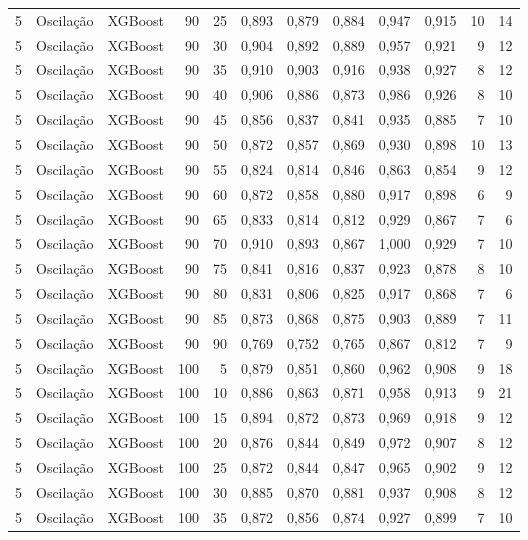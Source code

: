 \begin{longtable}{@{}rllrrrrrrrrr@{}}
5 & Oscilação & XGBoost & 90 & 25 & 0,893 & 0,879 & 0,884 & 0,947 & 0,915 & 10 & 14 \\
5 & Oscilação & XGBoost & 90 & 30 & 0,904 & 0,892 & 0,889 & 0,957 & 0,921 & 9 & 12 \\
5 & Oscilação & XGBoost & 90 & 35 & 0,910 & 0,903 & 0,916 & 0,938 & 0,927 & 8 & 12 \\
5 & Oscilação & XGBoost & 90 & 40 & 0,906 & 0,886 & 0,873 & 0,986 & 0,926 & 8 & 10 \\
5 & Oscilação & XGBoost & 90 & 45 & 0,856 & 0,837 & 0,841 & 0,935 & 0,885 & 7 & 10 \\
5 & Oscilação & XGBoost & 90 & 50 & 0,872 & 0,857 & 0,869 & 0,930 & 0,898 & 10 & 13 \\
5 & Oscilação & XGBoost & 90 & 55 & 0,824 & 0,814 & 0,846 & 0,863 & 0,854 & 9 & 12 \\
5 & Oscilação & XGBoost & 90 & 60 & 0,872 & 0,858 & 0,880 & 0,917 & 0,898 & 6 & 9 \\
5 & Oscilação & XGBoost & 90 & 65 & 0,833 & 0,814 & 0,812 & 0,929 & 0,867 & 7 & 6 \\
5 & Oscilação & XGBoost & 90 & 70 & 0,910 & 0,893 & 0,867 & 1,000 & 0,929 & 7 & 10 \\
5 & Oscilação & XGBoost & 90 & 75 & 0,841 & 0,816 & 0,837 & 0,923 & 0,878 & 8 & 10 \\
5 & Oscilação & XGBoost & 90 & 80 & 0,831 & 0,806 & 0,825 & 0,917 & 0,868 & 7 & 6 \\
5 & Oscilação & XGBoost & 90 & 85 & 0,873 & 0,868 & 0,875 & 0,903 & 0,889 & 7 & 11 \\
5 & Oscilação & XGBoost & 90 & 90 & 0,769 & 0,752 & 0,765 & 0,867 & 0,812 & 7 & 9 \\
5 & Oscilação & XGBoost & 100 & 5 & 0,879 & 0,851 & 0,860 & 0,962 & 0,908 & 9 & 18 \\
5 & Oscilação & XGBoost & 100 & 10 & 0,886 & 0,863 & 0,871 & 0,958 & 0,913 & 9 & 21 \\
5 & Oscilação & XGBoost & 100 & 15 & 0,894 & 0,872 & 0,873 & 0,969 & 0,918 & 9 & 12 \\
5 & Oscilação & XGBoost & 100 & 20 & 0,876 & 0,844 & 0,849 & 0,972 & 0,907 & 8 & 12 \\
5 & Oscilação & XGBoost & 100 & 25 & 0,872 & 0,844 & 0,847 & 0,965 & 0,902 & 9 & 12 \\
5 & Oscilação & XGBoost & 100 & 30 & 0,885 & 0,870 & 0,881 & 0,937 & 0,908 & 8 & 12 \\
5 & Oscilação & XGBoost & 100 & 35 & 0,872 & 0,856 & 0,874 & 0,927 & 0,899 & 7 & 10 \\

\end{longtable}
